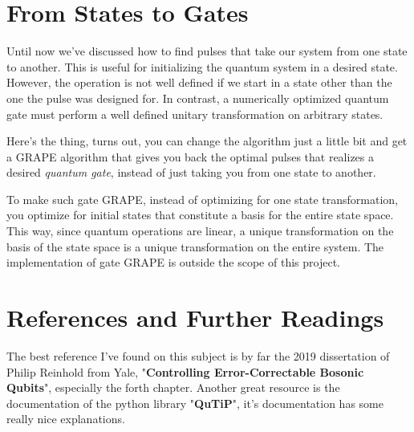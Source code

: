 \section{From States to Gates}\label{sec:gate-GRAPE}
Until now we've discussed how to find pulses that take our system from one state to another. This is useful for initializing the quantum system in a desired state. However, the operation is not well defined if we start in a state other than the one the pulse was designed for. In contrast, a  numerically optimized quantum gate must perform a well defined unitary transformation on arbitrary states.

Here's the thing, turns out, you can change the algorithm just a little bit and get a GRAPE algorithm that gives you back the optimal pulses that realizes a desired \textit{quantum gate}, instead of just taking you from one state to another. 

To make such gate GRAPE, instead of optimizing for one state transformation, you optimize for  initial states that constitute a basis for the entire state space. This way, since quantum operations are linear, a unique transformation on the basis of the state space is a unique transformation on the entire system. The implementation of gate GRAPE is outside the scope of this project.

\section{References and Further Readings}
The best reference I've found on this subject is by far the 2019 dissertation of Philip Reinhold from Yale, "\textbf{Controlling Error-Correctable Bosonic Qubits}", especially the forth chapter. Another great resource is the documentation of the python library "\textbf{QuTiP}", it's documentation has some really nice explanations.
